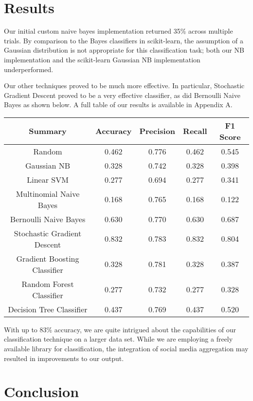 \documentclass[letterpaper]{article}
\begin{document}
\section{Results}

\noindent Our initial custom naive bayes implementation returned 35\% across multiple trials. By comparison to the Bayes classifiers in scikit-learn, the assumption of a Gaussian distribution is not appropriate for this classification task; both our NB implementation and the scikit-learn Gaussian NB implementation underperformed.

Our other techniques proved to be much more effective. In particular, Stochastic Gradient Descent proved to be a very effective classifier, as did Bernoulli Naive Bayes as shown below.  A full table of our results is available in Appendix A.

\begin{tabular}{c | c c c c}
\textbf{Summary}    & Accuracy  & Precision & Recall    & F1 Score  \\
\hline
Random      & 0.462     & 0.776     & 0.462     & 0.545     \\
Gaussian NB     & 0.328     & 0.742     & 0.328     & 0.398     \\
Linear SVM      & 0.277     & 0.694     & 0.277     & 0.341     \\
Multinomial Naive Bayes     & 0.168     & 0.765     & 0.168     & 0.122     \\
Bernoulli Naive Bayes       & 0.630     & 0.770     & 0.630     & 0.687     \\
Stochastic Gradient Descent     & 0.832     & 0.783     & 0.832     & 0.804     \\
Gradient Boosting Classifier        & 0.328     & 0.781     & 0.328     & 0.387     \\
Random Forest Classifier        & 0.277     & 0.732     & 0.277     & 0.328     \\
Decision Tree Classifier        & 0.437     & 0.769     & 0.437     & 0.520     \\
\end{tabular}

With up to 83\% accuracy, we are quite intrigued about the capabilities of our classification technique on a larger data set. While we are employing a freely available library for classification, the integration of social media aggregation may resulted in improvements to our output.

\section{Conclusion}
\end{document}
